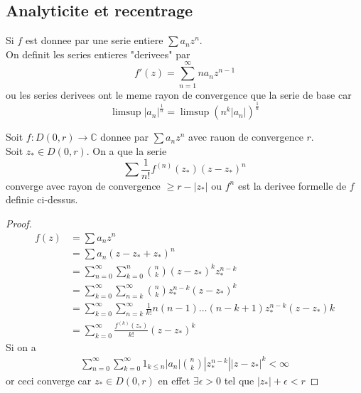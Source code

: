 \documentclass[../main.tex]{subfiles}
\begin{document}
\subsection{Analyticite et recentrage}
\begin{defn}
	Si $f$ est donnee par une serie entiere $ \sum a_nz^{n}$.\\
	On definit les series entieres "derivees" par
	\[ 
		f'( z) = \sum_{n=1}^{ \infty } n a_n z^{n-1}
	\]
	ou les series derivees ont le meme rayon de convergence que la serie de base car
	\[ 
		\limsup |a_n|^{\frac{1}{n}}= \limsup ( n^{k}|a_n|)^{\frac{1}{n}}
	\]
		
\end{defn}
\begin{lemma}
	Soit $f: D( 0,r) \to \mathbb{C}$ donnee par $\sum a_n z^{n}$ avec rauon de convergence $r$.\\
	Soit $z_{\ast} \in D( 0,r) $. On a que la serie
	\[ 
		\sum \frac{1}{n!}f^{( n) }( z_\ast) ( z-z_{\ast} ) ^{n}	
	\]
	converge avec rayon de convergence $ \geq r- |z_{\ast} | $ ou $f^{n}$ est la derivee formelle de $f$ definie ci-dessus.
\end{lemma}
\begin{proof}
	\begin{align*}
		f( z) &= \sum a_n z^{n}\\
		      &= \sum a_n ( z-z_\ast + z_\ast) ^{n}\\
		      &= \sum_{n=0}^{ \infty }\sum_{k=0} ^{n}\binom n k ( z-z_\ast) ^{k}z_\ast^{n-k}\\
		      &= \sum_{k=0}^{ \infty } \sum_{n=k}^{ \infty }\binom n k z_{\ast} ^{n-k}( z-z_\ast) ^{k}\\
		      &= \sum_{k=0}^{ \infty } \sum_{n=k}^{ \infty } \frac{1}{k!} n ( n-1) \ldots ( n-k+1) z_{\ast} ^{n-k} ( z-z_{\ast} ) k\\
		      &= \sum_{k=0}^{ \infty } \frac{f^{( k) }( z_{\ast} ) }{k!}( z-z_{\ast} ) ^{k}
	\end{align*}
Si on a
\begin{align*}
\sum_{n=0}^{ \infty } \sum_{k=0}^{ \infty } 1_{k \leq n} |a_n| \binom n k |z_{\ast} ^{n-k}||z-z_{\ast} |^{k} < \infty 	
\end{align*}
or ceci converge car $z_{\ast} \in D( 0,r) $ en effet $\exists \epsilon>0$ tel que $|z_{\ast} |+\epsilon<r$ 

\end{proof}
\end{document}
